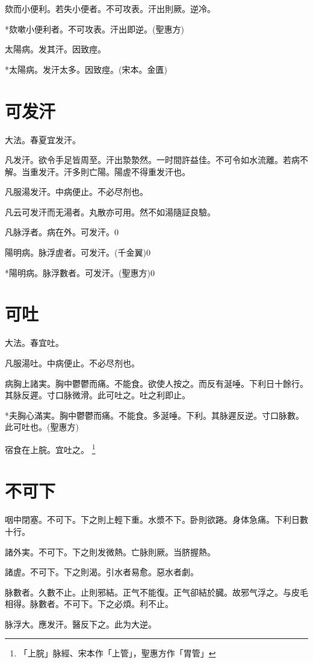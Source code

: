 \documentclass[b5paper,twoside,zihao=-4,UTF8]{ctexbook}
\begin{document}
欬而小便利。若失小便者。不可攻表。汗出則厥。逆冷。

*欬嗽小便利者。不可攻表。汗出即逆。(聖惠方)

太陽病。发其汗。因致痙。

*太陽病。发汗太多。因致痙。(宋本。金匱)

\chapter{可发汗}

大法。春夏宜发汗。

凡发汗。欲令手足皆周至。汗出漐漐然。一时間許益佳。不可令如水流離。若病不解。当重发汗。汗多則亡陽。陽虗不得重发汗也。

凡服湯发汗。中病便止。不必尽剂也。

凡云可发汗而无湯者。丸散亦可用。然不如湯隨証良驗。

凡脉浮者。病在外。可发汗。0

陽明病。脉浮虗者。可发汗。(千金翼)0

*陽明病。脉浮數者。可发汗。(聖惠方)0

\chapter{可吐}

大法。春宜吐。

凡服湯吐。中病便止。不必尽剂也。

病胸上諸実。胸中鬱鬱而痛。不能食。欲使人按之。而反有涎唾。下利日十餘行。其脉反遲。寸口{脉}微滑。此可吐之。吐之利即止。

*夫胸心滿実。胸中鬱鬱而痛。不能食。多涎唾。下利。其脉遲反逆。寸口脉數。此可吐也。(聖惠方)

宿食在上脘。宜吐之。
	\footnote{「上脘」脉經、宋本作「上管」，聖惠方作「胃管」}

\chapter{不可下}

咽中閉塞。不可下。下之則上輕下重。水漿不下。卧則欲踡。身体急痛。下利日數十行。

諸外実。不可下。下之則发微熱。亡脉則厥。当脐握熱。

諸虗。不可下。下之則渴。引水者易愈。惡水者劇。

脉數者。久數不止。止則邪結。正气不能復。正气卻結於臓。故邪气浮之。与皮毛相得。脉數者。不可下。下之必煩。利不止。

脉浮大。應发汗。醫反下之。此为大逆。
\end{document}
